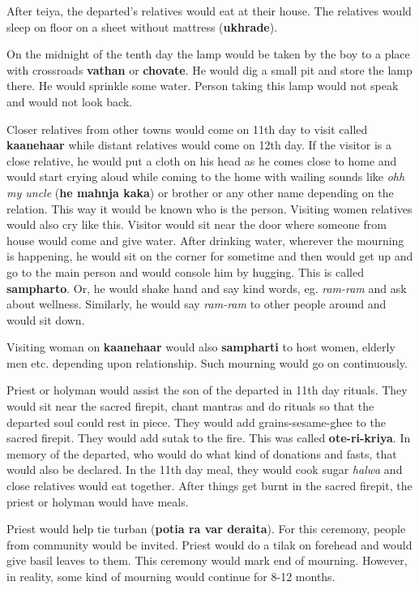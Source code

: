 After teiya, the departed's relatives would eat at their house. The relatives
would sleep on floor on a sheet without mattress (\textbf{ukhrade}).

On the midnight of the tenth day the lamp would be taken by the boy to a place
with crossroads \textbf{vathan} or \textbf{chovate}. He would dig a small pit
and store the lamp there. He would sprinkle some water. Person taking this lamp
would not speak and would not look back.

Closer relatives from other towns would come on 11th day to visit called
\textbf{kaanehaar} while distant relatives would come on 12th day. If the
visitor is a close relative, he would put a cloth on his head as he comes close
to home and would start crying aloud while coming to the home with wailing
sounds like \textit{ohh my uncle} (\textbf{he mahnja kaka}) or brother or any
other name depending on the relation. This way it would be known who is the
person. Visiting women relatives would also cry like this. Visitor would sit
near the door where someone from house would come and give water. After
drinking water, wherever the mourning is happening, he would sit on the corner
for sometime and then would get up and go to the main person and would console
him by hugging. This is called \textbf{sampharto}. Or, he would shake hand and
say kind words, eg. \textit{ram-ram} and ask about wellness. Similarly, he
would say \textit{ram-ram} to other people around and would sit down.

Visiting woman on \textbf{kaanehaar} would also \textbf{sampharti} to host
women, elderly men etc. depending upon relationship. Such mourning would go on
continuously.

Priest or holyman would assist the son of the departed in 11th day rituals.
They would sit near the sacred firepit, chant mantras and do rituals so
that the departed soul could rest in piece. They would add grains-sesame-ghee
to the sacred firepit. They would add sutak to the fire. This was called
\textbf{ote-ri-kriya}. In memory of the departed, who would do what kind of
donations and fasts, that would also be declared. In the 11th day meal, they
would cook sugar \textit{halwa} and close relatives would eat together. After
things get burnt in the sacred firepit, the priest or holyman would have
meals.

Priest would help tie turban (\textbf{potia ra var deraita}). For this
ceremony, people from community would be invited. Priest would do a tilak on
forehead and would give basil leaves to them. This ceremony would mark end of
mourning. However, in reality, some kind of mourning would continue for 8-12
months.

